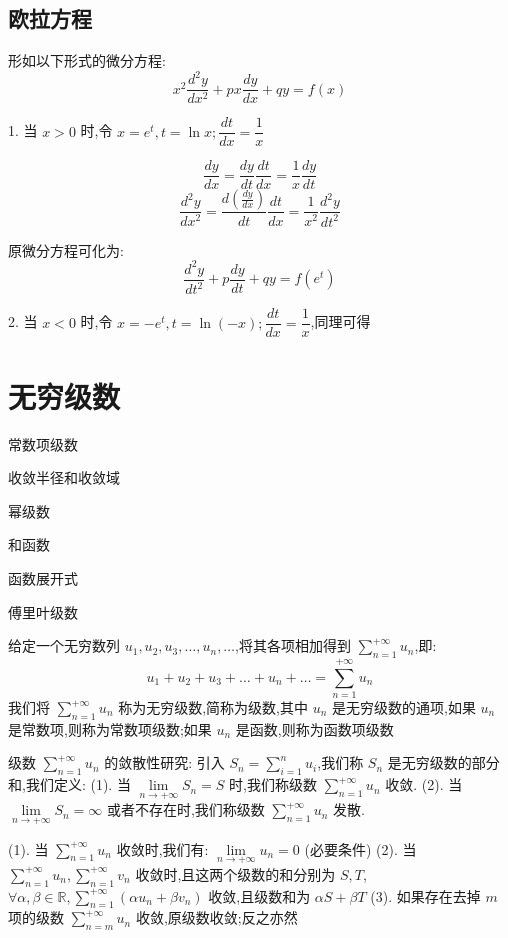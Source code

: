 \section{欧拉方程}
\begin{definition}[欧拉方程]\label{def: 欧拉方程}
	形如以下形式的微分方程:
	$$x^{2}\dfrac{d^{2}y}{dx^2}+px\dfrac{dy}{dx}+qy=f(x)$$

	1. 当 $x>0$ 时,令 $x=e^t,t=\ln x;\dfrac{dt}{dx}=\dfrac{1}{x}$

	$$\dfrac{dy}{dx}=\dfrac{dy}{dt}\dfrac{dt}{dx}=\dfrac{1}{x}\dfrac{dy}{dt}$$
	$$\dfrac{d^{2}y}{dx^2}=\dfrac{d(\frac{dy}{dx})}{dt}\dfrac{dt}{dx}=\dfrac{1}{x^2}\dfrac{d^{2}y}{dt^2}$$

	原微分方程可化为:
	$$\dfrac{d^{2}y}{dt^2}+p\dfrac{dy}{dt}+qy=f(e^t)$$

	2. 当 $x<0$ 时,令 $x=-e^t,t=\ln(-x);\dfrac{dt}{dx}=\dfrac{1}{x}$,同理可得
\end{definition}
\chapter{无穷级数}
\begin{introduction}
	\item 常数项级数
	\item 收敛半径和收敛域
	\item 幂级数
	\item 和函数
	\item 函数展开式
	\item 傅里叶级数
\end{introduction}
\begin{definition}
	给定一个无穷数列 $u_{1},u_{2},u_{3},\dots,u_{n},\dots$,将其各项相加得到 $\sum\limits_{n=1}^{+\infty}u_{n}$,即:
	$$u_{1}+u_{2}+u_{3}+\dots+u_{n}+\dots=\sum_{n=1}^{+\infty}u_{n}$$
	我们将 $\sum\limits_{n=1}^{+\infty}u_{n}$ 称为无穷级数,简称为级数,其中 $u_{n}$ 是无穷级数的通项,如果 $u_{n}$ 是常数项,则称为常数项级数;如果 $u_{n}$ 是函数,则称为函数项级数
\end{definition}
\begin{definition}[级数敛散性]
	级数 $\sum\limits_{n=1}^{+\infty}u_{n}$ 的敛散性研究:
	引入 $S_{n}=\sum\limits_{i=1}^{n}u_{i}$,我们称 $S_{n}$ 是无穷级数的部分和,我们定义:
	(1). 当 $\lim\limits_{n\rightarrow +\infty}S_{n}=S$ 时,我们称级数 $\sum\limits_{n=1}^{+\infty}u_{n}$ 收敛.
	(2). 当 $\lim\limits_{n\rightarrow +\infty}S_{n}=\infty$ 或者不存在时,我们称级数 $\sum\limits_{n=1}^{+\infty}u_{n}$ 发散.
\end{definition}
\begin{corollary}
	(1). 当 $\sum\limits_{n=1}^{+\infty}u_{n}$ 收敛时,我们有:  $\lim\limits_{n\rightarrow +\infty}u_{n}=0$ (必要条件)
	(2). 当 $\sum\limits_{n=1}^{+\infty}u_{n},\sum\limits_{n=1}^{+\infty}v_{n}$ 收敛时,且这两个级数的和分别为 $S,T$, $\forall \alpha ,\beta \in \mathbb{R} ,\sum\limits_{n=1}^{+\infty}(\alpha u_{n}+\beta v_{n})$ 收敛,且级数和为 $\alpha S+\beta T$
	(3). 如果存在去掉 $m$ 项的级数 $\sum\limits_{n=m}^{+\infty}u_{n}$ 收敛,原级数收敛;反之亦然
\end{corollary}
